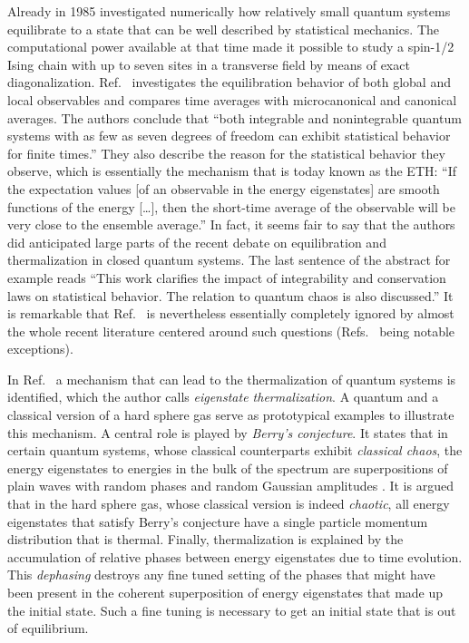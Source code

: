 \documentclass[a4paper,12pt,listof=totoc,index=totoc,bibliography=totoc,headsepline=false,headings=normal,BCOR16.153846mm,DIV12,headinclude,twoside,cleardoublepage=empty,numbers=noenddot,final]{scrreprt}
\theoremstyle{mystyle}
\numberwithin{equation}{section}
\numberwithin{figure}{section}
\numberwithin{lemma}{section}
\numberwithin{theorem}{section}
\numberwithin{corollary}{section}
\numberwithin{definition}{section}
\numberwithin{conjecture}{section}
\numberwithin{observation}{section}
\newcommand{\+}{\mkern2mu}
\DeclareMathOperator{\1}{\mathds{1}}
\begin{document}
Already in 1985 \textcite{Jensen1985} investigated numerically how relatively small quantum systems equilibrate to a state that can be well described by statistical mechanics.
The computational power available at that time made it possible to study a spin-1/2 Ising chain with up to seven sites in a transverse field by means of exact diagonalization.
Ref.~\cite{Jensen1985} investigates the equilibration behavior of both global and local observables and compares time averages with microcanonical and canonical averages.
The authors conclude that ``both integrable and nonintegrable quantum systems with as few as seven degrees of freedom can exhibit statistical behavior for finite times.''
They also describe the reason for the statistical behavior they observe, which is essentially the mechanism that is today known as the ETH: ``If the expectation values [of an observable in the energy eigenstates] are smooth functions of the energy [\dots], then the short-time average of the observable will be very close to the ensemble average.''
In fact, it seems fair to say that the authors did anticipated large parts of the recent debate on equilibration and thermalization in closed quantum systems.
The last sentence of the abstract for example reads ``This work clarifies the impact of integrability and conservation laws on statistical behavior. The relation to quantum chaos is also discussed.''
It is remarkable that Ref.~\cite{Jensen1985} is nevertheless essentially completely ignored by almost the whole recent literature centered around such questions (Refs.~\cite{Yukalov2011,Reimann2013} being notable exceptions).

In Ref.~\cite{PhysRevA.43.20} a mechanism that can lead to the thermalization of quantum systems is identified, which the author calls \emph{eigenstate thermalization}.
A quantum and a classical version of a hard sphere gas serve as prototypical examples to illustrate this mechanism.
A central role is played by \emph{Berry's conjecture}.
It states that in certain quantum systems, whose classical counterparts exhibit \emph{classical chaos}, the energy eigenstates to energies in the bulk of the spectrum are superpositions of plain waves with random phases and random Gaussian amplitudes \cite{Berry1977}.
It is argued that in the hard sphere gas, whose classical version is indeed \emph{chaotic}, all energy eigenstates that satisfy Berry's conjecture have a single particle momentum distribution that is thermal.
Finally, thermalization is explained by the accumulation of relative phases between energy eigenstates due to time evolution.
This \emph{dephasing} destroys any fine tuned setting of the phases that might have been present in the coherent superposition of energy eigenstates that made up the initial state.
Such a fine tuning is necessary to get an initial state that is out of equilibrium.
\end{document}

